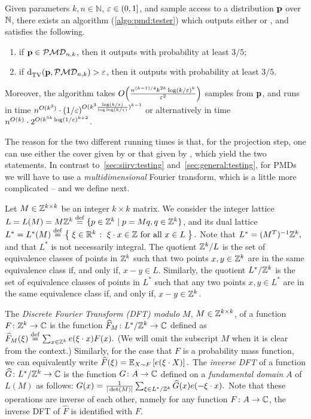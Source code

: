 \begin{theorem}
    Given parameters $k,n\in\mathbb{N}$, $\eps\in(0,1]$, and sample access to a distribution $\p$ over $\N$, there exists an algorithm (\cref{algo:pmd:tester}) which outputs either \accept or \reject, and satisfies the following.
    \begin{enumerate}
        \item if $\p \in \classpmd[n]{k}$, then it outputs \accept with probability at least $3/5$;
        \item if $\totalvardist{\p}{\classpmd[n]{k}} > \eps$, then it outputs \reject with probability at least $3/5$.
    \end{enumerate}
    Moreover, the algorithm takes $\bigO{\frac{n^{(k-1)/4} k^{2k} \log(k/\eps)^k}{\eps^2}}$ samples from $\p$, and runs in time $n^{O(k^3)} \cdot (1/\eps)^{O(k^3\frac{\log(k/\eps)}{\log\log(k/\eps)})^{k-1}}$ or alternatively in time $n^{O(k)} \cdot  2^{O(k^{5k} \log(1/\eps)^{k+2}}$.
\end{theorem}
The reason for the two different running times is that, for the projection step, one can use either the cover given by \cite{DKS:15b} or that given by \cite{DDKT:16}, which yield the two statements.
In contrast to~\cref{sec:siirv:testing} and~\cref{sec:general:testing}, for PMDs we will have to use a \emph{multidimensional} Fourier transform, which is a little more complicated -- and we define next.


Let $M \in \Z^{k \times k}$ be an integer $k \times k$ matrix.
We consider the integer lattice
$L  = L(M) =  M \Z^k \eqdef \{ p \in \Z^k \mid p = M q,  q \in \Z^k \}$, and its dual lattice
 $L^{\ast} = L^{\ast}(M)   \eqdef \setOfSuchThat{ \xi \in \R^k }{ \xi \cdot x \in \Z \textrm{ for all } x \in L }.$
 Note that  $L^{\ast} = (M^T)^{-1} \Z^k,$ and that $L^{\ast}$ is not necessarily integral.
The quotient $ \Z^k \slash L$ is the set of equivalence classes of points in $\Z^k$ such that two points $x, y \in \Z^k$
are in the same equivalence class if, and only if, $x - y \in L$.
Similarly, the quotient $L^{\ast} \slash \Z^k$ is the set of equivalence
classes of points in $L^{\ast}$ such that any two points $x, y \in L^{\ast}$ are in the same equivalence class if, and only if, $x -y \in \Z^k$.

The \emph{Discrete Fourier Transform (DFT) modulo $M$}, $M \in \Z^{k \times k}$, of a function
$F\colon \Z^k \to \C$ is  the function $\widehat{F}_M\colon L^{\ast} \slash \Z^k  \to \C$
defined as $\widehat{F}_M(\xi)\eqdef\sum_{x \in  \Z^k} e(\xi \cdot x) F(x).$ 
(We will omit the subscript $M$ when it is clear from the context.)
Similarly, for the case that $F$ is a probability mass function, we can equivalently write
$\widehat{F}(\xi)= \shortexpect_{X \sim F} \left[ e(\xi \cdot X) \right].$ The \emph{inverse DFT} of a function $\widehat{G}\colon L^{\ast} \slash \Z^k  \to \C$
is the function $G\colon A \to \C$ defined on a \emph{fundamental domain} $A$ of $L(M)$ as follows:
$G(x) = \frac{1}{|\det(M)|} \sum_{\xi \in L^{\ast} \slash \Z^k} \widehat{G}(x) e(- \xi \cdot x).$
Note that these operations are inverse of each other,
namely for any function $F\colon A \to \C$, the inverse DFT of $\widehat{F}$ is identified with  $F$.

